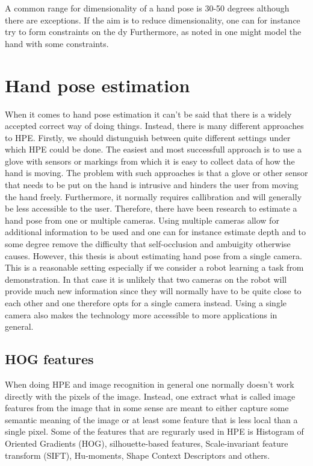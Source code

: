 \documentclass[a4paper,11pt]{kth-mag}
\begin{document}
A common range for dimensionality of a hand pose is 30-50 degrees %
although there are exceptions.
If the aim is to reduce dimensionality, one can for instance try to form constraints on the dy
Furthermore, as noted in
one might model the hand with some constraints.

\section{Hand pose estimation}
When it comes to hand pose estimation it can't be said that there is a widely accepted correct way of doing things.
Instead, there is many different approaches to HPE.
Firstly, we should distunguish between quite different settings under which HPE could be done.
The easiest and most successfull approach is to use a glove with sensors or markings from which it is easy to collect data of how the hand is moving.
The problem with such approaches is that a glove or other sensor that needs to be put on the hand is intrusive and hinders the user from moving the hand freely.
Furthermore, it normally requires callibration and will generally be less accessible to the user.
Therefore, there have been research to estimate a hand pose from one or multiple cameras.
Using multiple cameras allow for additional information to be used and one can for instance estimate depth and to some degree remove the difficulty that self-occlusion and ambuigity otherwise causes.
However, this thesis is about estimating hand pose from a single camera.
This is a reasonable setting especially if we consider a robot learning a task from demonstration.
In that case it is unlikely that two cameras on the robot will provide much new information since they will normally have to be quite close to each other and one therefore opts for a single camera instead.
Using a single camera also makes the technology more accessible to more applications in general.


\subsection{HOG features}
When doing HPE and image recognition in general one normally doesn't work directly with the pixels of the image.
Instead, one extract what is called image features from the image that in some sense are meant to either capture some semantic meaning of the image or at least some feature that is less local than a single pixel.
Some of the features that are regurarly used in HPE is Histogram of Oriented Gradients (HOG)\cite{HOG}, silhouette-based features, Scale-invariant feature transform (SIFT),  Hu-moments, Shape Context Descriptors and others.  
\end{document}
